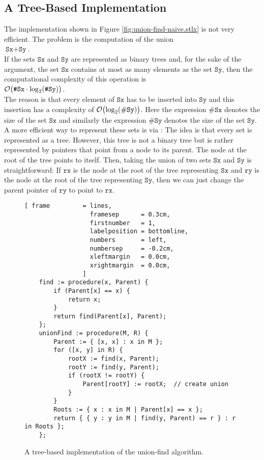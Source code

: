 \subsection{A Tree-Based Implementation}
The implementation shown in Figure \ref{fig:union-find-naive.stlx} is not very efficient.  The
problem is the computation of the union
\\
\hspace*{1.3cm}
$\texttt{Sx} + \texttt{Sy}$.
\\[0.2cm]
If the sets $\texttt{Sx}$ and $\texttt{Sy}$ are represented as binary trees and, for the sake of the
argument, the set $\texttt{Sx}$ contains at most as many elements as the set $\texttt{Sy}$, then the
computational complexity of this operation is
\\
\hspace*{1.3cm}
$\mathcal{O}\bigl(\texttt{\#Sx} \cdot \log_2(\texttt{\#Sy})\bigr)$.  
\\[0.2cm]
The reason is that every element of $\texttt{Sx}$ has to be inserted into $\texttt{Sy}$ and this
insertion has a complexity of $\mathcal{O}\bigl(\log_2(\#\texttt{Sy})\bigr)$.  Here the expression
$\texttt{\#Sx}$ denotes the size of the set $\texttt{Sx}$ and similarly the expression
$\texttt{\#Sy}$ denotes the size of the set $\texttt{Sy}$.  A more efficient way to
represent these sets is via :  The idea is that every set is represented as a
tree.  However, this tree is not a binary tree but is rather represented by pointers that
point from a node to its parent.  The node at the root of the tree points to itself.  Then, taking the
union of two sets $\texttt{Sx}$ and $\texttt{Sy}$ is straightforward:  If $\texttt{rx}$ is the node at the root of
the tree representing $\texttt{Sx}$ and $\texttt{ry}$ is the node at the root of the tree representing
$\texttt{Sy}$, then we can just change the parent pointer of $\texttt{ry}$ to point to $\texttt{rx}$.

\begin{figure}[!ht]
\centering
\begin{Verbatim}[ frame         = lines, 
                  framesep      = 0.3cm, 
                  firstnumber   = 1,
                  labelposition = bottomline,
                  numbers       = left,
                  numbersep     = -0.2cm,
                  xleftmargin   = 0.0cm,
                  xrightmargin  = 0.0cm,
                ]
    find := procedure(x, Parent) {
        if (Parent[x] == x) {
            return x;
        }
        return find(Parent[x], Parent);
    };
    unionFind := procedure(M, R) {
        Parent := { [x, x] : x in M };  
        for ([x, y] in R) {
            rootX := find(x, Parent);
            rootY := find(y, Parent);
            if (rootX != rootY) {
                Parent[rootY] := rootX;  // create union
            }
        }
        Roots := { x : x in M | Parent[x] == x };
        return { { y : y in M | find(y, Parent) == r } : r in Roots };
    };
\end{Verbatim}
\vspace*{-0.3cm}
\caption{A tree-based implementation of the union-find algorithm.}
\label{fig:union-find-tree.stlx}
\end{figure}

